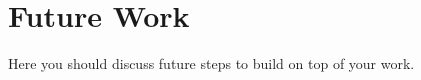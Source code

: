 \documentclass[a4paper,12pt,twoside,openany]{book}
\newif\ifthesis
\begin{document}
        \section{Future Work}
            Here you should discuss future steps to build on top of your work.
    \color{black}
\fi




\ifthesis
\chapter*{Appendix A:\\First Appendix}
\addcontentsline{toc}{chapter}{Appendix A: First Appendix}
\color{teal}
    OPTIONAL: If you require an appendix (e.g., for attaching a paper or attaching a piece of code) you can add it here.
\color{black}
\fi

\ifthesis
    \backmatter
    \pagestyle{empty}
    
                {AuxiliaryPages/abstract_hebrew_example}
    \clearpage
    
        
                {AuxiliaryPages/front_page_hebrew_phd_thesis_example}
    \clearpage
\fi
\end{document}
